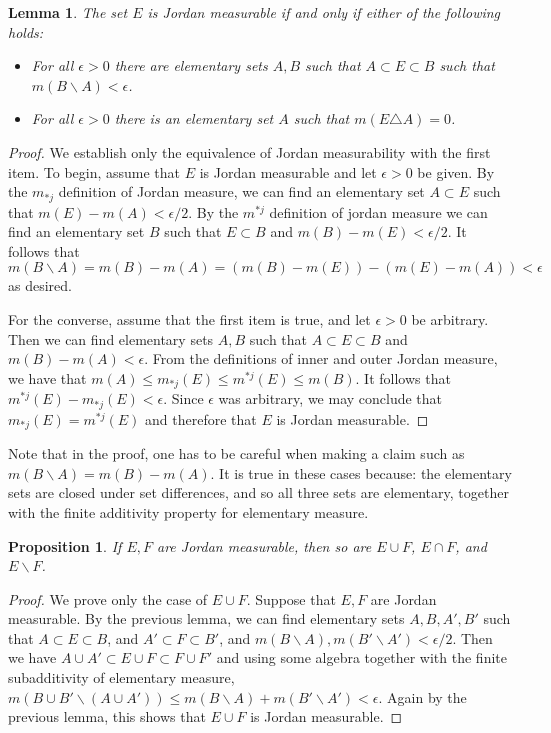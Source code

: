 \documentclass[11pt,oneside]{amsbook}
\renewcommand{\setminus}{\smallsetminus}
\theoremstyle{definition}
\theoremstyle{plain}
\newtheorem{lem}[thm]{Lemma}
\newtheorem{prop}[thm]{Proposition}
\theoremstyle{definition}
\theoremstyle{remark}
\numberwithin{equation}{section}
\numberwithin{figure}{section}
\begin{document}
\begin{lem}
  \label{lem:jordan-equiv}
  The set $E$ is Jordan measurable if and only if either of the following holds:
  \begin{itemize}
  \item For all $\epsilon>0$ there are elementary sets $A,B$ such that $A\subset E\subset B$ such that $m(B\setminus A)<\epsilon$.
  \item For all $\epsilon>0$ there is an elementary set $A$ such that $m(E\triangle A)=0$.
  \end{itemize}
\end{lem}

\begin{proof}
  We establish only the equivalence of Jordan measurability with the first item. To begin, assume that $E$ is Jordan measurable and let $\epsilon>0$ be given. By the $m_{*j}$ definition of Jordan measure, we can find an elementary set $A\subset E$ such that $m(E)-m(A)<\epsilon/2$. By the $m^{*j}$ definition of jordan measure we can find an elementary set $B$ such that $E\subset B$ and $m(B)-m(E)<\epsilon/2$. It follows that 
\[m(B\setminus A)=m(B)-m(A)=(m(B)-m(E))-(m(E)-m(A))<\epsilon
\]
as desired.

  For the converse, assume that the first item is true, and let $\epsilon>0$ be arbitrary. Then we can find elementary sets $A,B$ such that $A\subset E\subset B$ and $m(B)-m(A)<\epsilon$. From the definitions of inner and outer Jordan measure, we have that $m(A)\leq m_{*j}(E)\leq m^{*j}(E)\leq m(B)$. It follows that $m^{*j}(E)-m_{*j}(E)<\epsilon$. Since $\epsilon$ was arbitrary, we may conclude that $m_{*j}(E)=m^{*j}(E)$ and therefore that $E$ is Jordan measurable.
\end{proof}

Note that in the proof, one has to be careful when making a claim such as $m(B\setminus A)=m(B)-m(A)$. It is true in these cases because: the elementary sets are closed under set differences, and so all three sets are elementary, together with the finite additivity property for elementary measure.

\begin{prop}
  If $E,F$ are Jordan measurable, then so are $E\cup F$, $E\cap F$, and $E\setminus F$.
\end{prop}

\begin{proof}
  We prove only the case of $E\cup F$. Suppose that $E,F$ are Jordan measurable. By the previous lemma, we can find elementary sets $A,B,A',B'$ such that $A\subset E\subset B$, and $A'\subset F\subset B'$, and $m(B\setminus A),m(B'\setminus A')<\epsilon/2$. Then we have $A\cup A'\subset E\cup F\subset F\cup F'$ and using some algebra together with the finite subadditivity of elementary measure, $m(B\cup B'\setminus(A\cup A'))\leq m(B\setminus A)+m(B'\setminus A')<\epsilon$. Again by the previous lemma, this shows that $E\cup F$ is Jordan measurable.
\end{proof}
\end{document}
